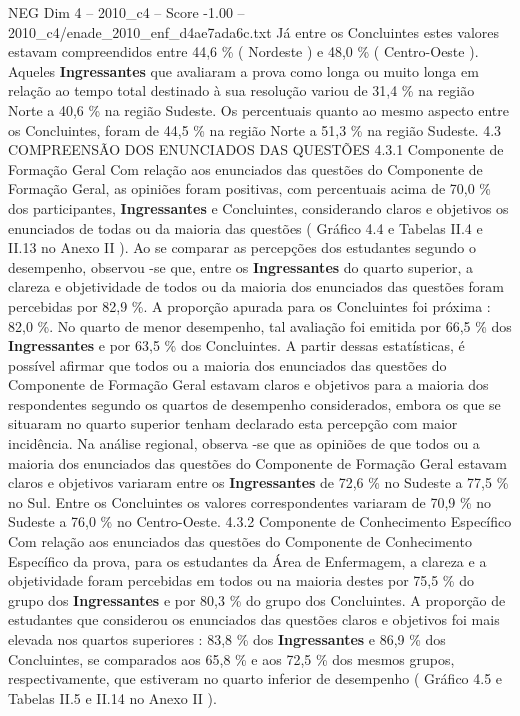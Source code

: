 \begin{textsample}{NEG Dim 4 – 2010\_c4 – Score -1.00 – 2010\_c4/enade\_2010\_enf\_d4ae7ada6c.txt}
Já entre os Concluintes estes valores estavam compreendidos entre 44,6 \% ( Nordeste ) e 48,0 \% ( Centro-Oeste ).
Aqueles \textbf{Ingressantes} que avaliaram a prova como longa ou muito longa em relação ao tempo total destinado à sua resolução variou de 31,4 \% na região Norte a 40,6 \% na região Sudeste.
Os percentuais quanto ao mesmo aspecto entre os Concluintes, foram de 44,5 \% na região Norte a 51,3 \% na região Sudeste. 4.3 COMPREENSÃO DOS ENUNCIADOS DAS QUESTÕES 4.3.1 Componente de Formação Geral Com relação aos enunciados das questões do Componente de Formação Geral, as opiniões foram positivas, com percentuais acima de 70,0 \% dos participantes, \textbf{Ingressantes} e Concluintes, considerando claros e objetivos os enunciados de todas ou da maioria das questões ( Gráfico 4.4 e Tabelas II.4 e II.13 no Anexo II ).
Ao se comparar as percepções dos estudantes segundo o desempenho, observou -se que, entre os \textbf{Ingressantes} do quarto superior, a clareza e objetividade de todos ou da maioria dos enunciados das questões foram percebidas por 82,9 \%.
A proporção apurada para os Concluintes foi próxima : 82,0 \%.
No quarto de menor desempenho, tal avaliação foi emitida por 66,5 \% dos \textbf{Ingressantes} e por 63,5 \% dos Concluintes.
A partir dessas estatísticas, é possível afirmar que todos ou a maioria dos enunciados das questões do Componente de Formação Geral estavam claros e objetivos para a maioria dos respondentes segundo os quartos de desempenho considerados, embora os que se situaram no quarto superior tenham declarado esta percepção com maior incidência.
Na análise regional, observa -se que as opiniões de que todos ou a maioria dos enunciados das questões do Componente de Formação Geral estavam claros e objetivos variaram entre os \textbf{Ingressantes} de 72,6 \% no Sudeste a 77,5 \% no Sul.
Entre os Concluintes os valores correspondentes variaram de 70,9 \% no Sudeste a 76,0 \% no Centro-Oeste. 4.3.2 Componente de Conhecimento Específico Com relação aos enunciados das questões do Componente de Conhecimento Específico da prova, para os estudantes da Área de Enfermagem, a clareza e a objetividade foram percebidas em todos ou na maioria destes por 75,5 \% do grupo dos \textbf{Ingressantes} e por 80,3 \% do grupo dos Concluintes.
A proporção de estudantes que considerou os enunciados das questões claros e objetivos foi mais elevada nos quartos superiores : 83,8 \% dos \textbf{Ingressantes} e 86,9 \% dos Concluintes, se comparados aos 65,8 \% e aos 72,5 \% dos mesmos grupos, respectivamente, que estiveram no quarto inferior de desempenho ( Gráfico 4.5 e Tabelas II.5 e II.14 no Anexo II ).

\end{textsample}
